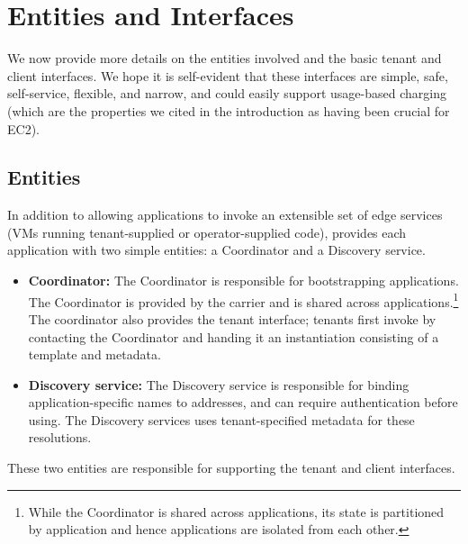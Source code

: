 \section{Entities and Interfaces}
\label{sec:interfaces}

We now provide more details on the entities involved and the basic tenant and client interfaces. We hope it is self-evident that these interfaces are simple, safe, self-service, flexible, and narrow, and could easily support usage-based charging (which are the properties we cited in the introduction as having been crucial for EC2).

\subsection{Entities}

In addition to allowing applications to invoke an extensible set of edge services (\ie VMs running tenant-supplied or operator-supplied code), \name provides each application with two simple entities: a Coordinator and a Discovery service. 
\begin{itemize}
\item {\bf Coordinator:} The Coordinator is responsible for bootstrapping applications. The Coordinator is provided by the carrier and is shared across applications.\footnote{While the Coordinator is shared across applications, its state is partitioned by application and hence applications are isolated from each other.} The coordinator also provides the tenant interface; tenants first invoke \name by contacting the Coordinator and handing it an instantiation consisting of a template and metadata. 
\item {\bf Discovery service:} The Discovery service is responsible for binding application-specific names to addresses, and can require authentication before using. The Discovery services uses tenant-specified metadata for these resolutions.

\end{itemize}

These two entities are responsible for supporting the tenant and client interfaces.

